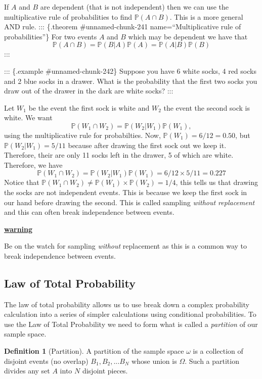 \documentclass[
]{book}
\newcommand{\prob}[1]{{\mathbb{P}(#1)}}
\newenvironment{rmdblock}[1]
  {\begin{shaded*}
  \centerline{\underline{\textbf{#1}}}

  }
  {
  \end{shaded*}
  }
\newenvironment{warning}
  {\begin{rmdblock}{warning}}
  {\end{rmdblock}}
\theoremstyle{definition}
\newtheorem{definition}{Definition}[chapter]
\theoremstyle{definition}
\theoremstyle{definition}
\theoremstyle{definition}
\theoremstyle{remark}
\begin{document}
If \(A\) and \(B\) are dependent (that is not independent) then we can use the multiplicative rule of probabilities to find \(\prob{A \cap B}\). This is a more general AND rule.
::: \{.theorem \#unnamed-chunk-241 name=``Multiplicative rule of probabilities''\}
For two events \(A\) and \(B\) which may be dependent we have that \[\prob{A \cap B}=\prob{B|A} \prob{A}=\prob{A|B} \prob{B}\]
:::

::: \{.example \#unnamed-chunk-242\}
Suppose you have 6 white socks, 4 red socks and 2 blue socks in a drawer. What is the probability that the first two socks you draw out of the drawer in the dark are white socks?
:::

Let \(W_1\) be the event the first sock is white and \(W_2\) the event the second sock is white. We want \[\prob{W_1 \cap W_2}=\prob{W_2|W_1} \prob{W_1}, \] using the multiplicative rule for probabilties. Now, \(\prob{W_1}=6/12=0.50\), but \(\prob{W_2|W_1}=5/11\) because after drawing the first sock out we keep it. Therefore, their are only 11 socks left in the drawer, 5 of which are white. Therefore, we have
\[
 \prob{W_1 \cap W_2}=\prob{W_2|W_1} \prob{W_1}=6/12 \times 5/11= 0.227
\]
Notice that \(\prob{W_1 \cap W_2} \neq \prob{W_1} \times \prob{W_2}=1/4\), this tells us that drawing the socks are not independent events. This is because we keep the first sock in our hand before drawing the second. This is called sampling \emph{without replacement} and this can often break independence between events.

\begin{warning}
Be on the watch for sampling \emph{without} replacement as this is a common way to break independence between events.
\end{warning}

\hypertarget{law-of-total-probability}{%
\subsection{Law of Total Probability}\label{law-of-total-probability}}

The law of total probability allows us to use break down a complex probability calculation into a series of simpler calculations using conditional probabilities. To use the Law of Total Probability we need to form what is called a \emph{partition} of our sample space.

\begin{definition}[Partition]
\protect\hypertarget{def:unnamed-chunk-244}{}\label{def:unnamed-chunk-244}A partition of the sample space \(\omega\) is a collection of disjoint events (no overlap) \(B_1, B_2, ... B_N\) whose union is \(\Omega\). Such a partition divides any set \(A\) into \(N\) disjoint pieces.
\end{definition}
\end{document}
